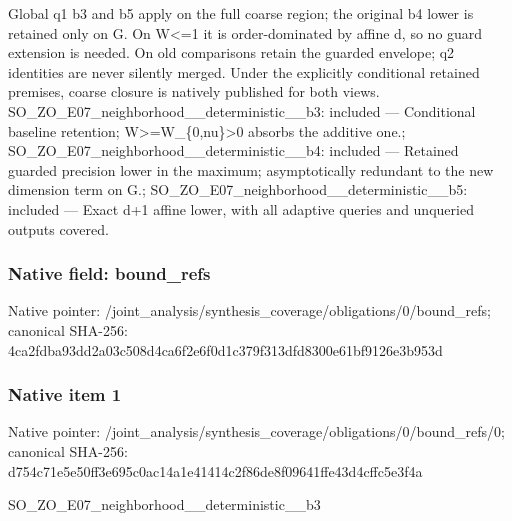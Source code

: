 \documentclass[10pt,a4paper]{article}
\begin{document}
\begingroup\raggedright\sloppy Global q1 b3 and b5 apply on the full coarse region;\allowbreak{} the original b4 lower is retained only on G. On W<=\allowbreak{}1 it is order-dominated by affine d,\allowbreak{} so no guard extension is needed. On old comparisons retain the guarded envelope;\allowbreak{} q2 identities are never silently merged. Under the explicitly conditional retained premises,\allowbreak{} coarse closure is natively published for both views. SO\_\allowbreak{}ZO\_\allowbreak{}E07\_\allowbreak{}neighborhood\_\allowbreak{}\_\allowbreak{}deterministic\_\allowbreak{}\_\allowbreak{}b3:\allowbreak{} included {\AtlasUnicodeText —}\allowbreak{} Conditional baseline retention;\allowbreak{} W>=\allowbreak{}W\_\allowbreak{}\{0,\allowbreak{}nu\}>0 absorbs the additive one.;\allowbreak{} SO\_\allowbreak{}ZO\_\allowbreak{}E07\_\allowbreak{}neighborhood\_\allowbreak{}\_\allowbreak{}deterministic\_\allowbreak{}\_\allowbreak{}b4:\allowbreak{} included {\AtlasUnicodeText —}\allowbreak{} Retained guarded precision lower in the maximum;\allowbreak{} asymptotically redundant to the new dimension term on G.;\allowbreak{} SO\_\allowbreak{}ZO\_\allowbreak{}E07\_\allowbreak{}neighborhood\_\allowbreak{}\_\allowbreak{}deterministic\_\allowbreak{}\_\allowbreak{}b5:\allowbreak{} included {\AtlasUnicodeText —}\allowbreak{} Exact d+1 affine lower,\allowbreak{} with all adaptive queries and unqueried outputs covered.\par\endgroup

\subsubsection{Native field: bound\_\allowbreak{}refs}
Native pointer: /joint\_\allowbreak{}analysis/synthesis\_\allowbreak{}coverage/obligations/0/bound\_\allowbreak{}refs; canonical SHA-256: 4ca2fdba93dd2a03c508d4ca6f2e6f0d1c379f313dfd8300e61bf9126e3b953d

\subsubsection{Native item 1}
Native pointer: /joint\_\allowbreak{}analysis/synthesis\_\allowbreak{}coverage/obligations/0/bound\_\allowbreak{}refs/0; canonical SHA-256: d754c71e5e50ff3e695c0ac14a1e41414c2f86de8f09641ffe43d4cffc5e3f4a

\begingroup\raggedright\sloppy SO\_\allowbreak{}ZO\_\allowbreak{}E07\_\allowbreak{}neighborhood\_\allowbreak{}\_\allowbreak{}deterministic\_\allowbreak{}\_\allowbreak{}b3\par\endgroup
\end{document}
